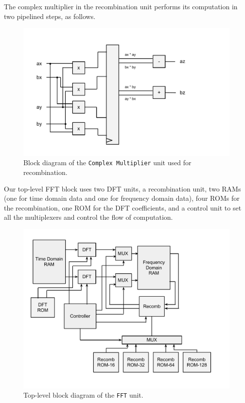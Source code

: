 \documentclass{article}
\begin{document}
The complex multiplier in the recombination unit performs its computation
in two pipelined steps, as follows.

\begin{figure}[H]
	\centering
	\includegraphics[scale=0.4]{complex-mult}
	\caption{Block diagram of the \texttt{Complex Multiplier} unit used for 
	recombination. }
\end{figure}

Our top-level FFT block uses two DFT units, a recombination unit,
two RAMs (one for time domain data and one for frequency domain data),
four ROMs for the recombination, one ROM for the DFT coefficients, and
a control unit to set all the multiplexers and control the flow of
computation.

\begin{figure}[H]
	\centering
	\includegraphics[scale=0.35]{fft-top}
	\caption{Top-level block diagram of the \texttt{FFT} unit.}
\end{figure}
\end{document}
